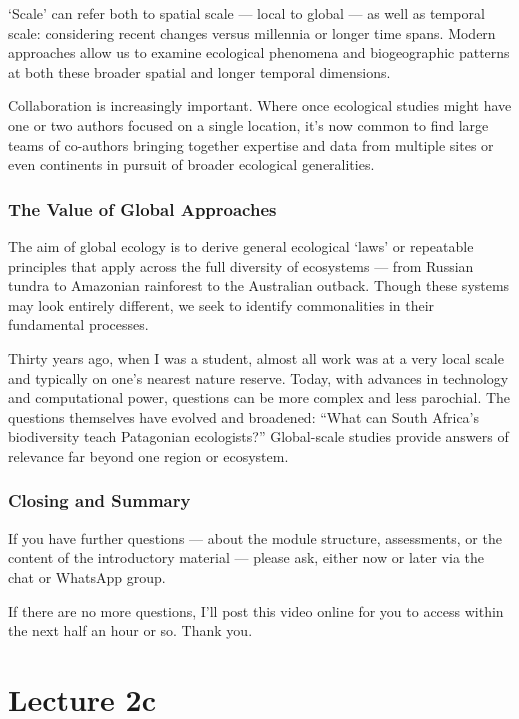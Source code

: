 \documentclass[
  10pt,
]{book}
\begin{document}
`Scale' can refer both to spatial scale --- local to global --- as well
as temporal scale: considering recent changes versus millennia or longer
time spans. Modern approaches allow us to examine ecological phenomena
and biogeographic patterns at both these broader spatial and longer
temporal dimensions.

Collaboration is increasingly important. Where once ecological studies
might have one or two authors focused on a single location, it's now
common to find large teams of co-authors bringing together expertise and
data from multiple sites or even continents in pursuit of broader
ecological generalities.

\subsection{The Value of Global
Approaches}\label{the-value-of-global-approaches}

The aim of global ecology is to derive general ecological `laws' or
repeatable principles that apply across the full diversity of ecosystems
--- from Russian tundra to Amazonian rainforest to the Australian
outback. Though these systems may look entirely different, we seek to
identify commonalities in their fundamental processes.

Thirty years ago, when I was a student, almost all work was at a very
local scale and typically on one's nearest nature reserve. Today, with
advances in technology and computational power, questions can be more
complex and less parochial. The questions themselves have evolved and
broadened: ``What can South Africa's biodiversity teach Patagonian
ecologists?'' Global-scale studies provide answers of relevance far
beyond one region or ecosystem.

\subsection{Closing and Summary}\label{closing-and-summary}

If you have further questions --- about the module structure,
assessments, or the content of the introductory material --- please ask,
either now or later via the chat or WhatsApp group.

If there are no more questions, I'll post this video online for you to
access within the next half an hour or so. Thank you.

\chapter*{Lecture 2c}\label{lecture-2c}
\end{document}
